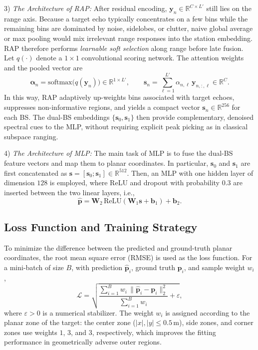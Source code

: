 \documentclass[sigconf]{acmart}
\begin{document}
3) \textit{The Architecture of RAP:}
After residual encoding, $\mathbf{y}_n\in\mathbb{R}^{C\times L'}$ still lies on the range axis. Because a target echo typically concentrates on a few bins while the remaining bins are dominated by noise, sidelobes, or clutter, naive global average or max pooling would mix irrelevant range responses into the station embedding. RAP therefore performs \emph{learnable soft selection} along range before late fusion. Let $q(\cdot)$ denote a $1\times 1$ convolutional scoring network. The attention weights and the pooled vector are
\begin{equation}
\boldsymbol{\alpha}_n=\mathrm{softmax}\bigl(q(\mathbf{y}_n)\bigr)\in\mathbb{R}^{1\times L'},
\qquad
\mathbf{s}_n=\sum_{\ell=1}^{L'}\alpha_{n,\ell}\,\mathbf{y}_{n,:,\ell}\in\mathbb{R}^{C}.
\end{equation}
In this way, RAP adaptively up-weights bins associated with target echoes, suppresses non-informative regions, and yields a compact vector $\mathbf{s}_n\in\mathbb{R}^{256}$ for each BS.
The dual-BS embeddings $\{\mathbf{s}_0,\mathbf{s}_1\}$ then provide complementary, denoised spectral cues to the MLP, without requiring explicit peak picking as in classical subspace ranging.

4) \textit{The Architecture of MLP:}
The main task of MLP is to fuse the dual-BS feature vectors and map them to planar coordinates. In particular, $\mathbf{s}_0$ and $\mathbf{s}_1$ are first concatenated as $\mathbf{s}=[\mathbf{s}_0;\mathbf{s}_1]\in\mathbb{R}^{512}$. Then, an MLP with one hidden layer of dimension $128$ is employed, where ReLU and dropout with probability $0.3$ are inserted between the two linear layers, i.e.,
\begin{equation}
\hat{\mathbf{p}}=
\mathbf{W}_2\,\mathrm{ReLU}(\mathbf{W}_1\mathbf{s}+\mathbf{b}_1)+\mathbf{b}_2.
\end{equation}

\subsection{Loss Function and Training Strategy}
To minimize the difference between the predicted and ground-truth planar coordinates, the root mean square error (RMSE) is used as the loss function. For a mini-batch of size $B$, with prediction $\hat{\mathbf{p}}_i$, ground truth $\mathbf{p}_i$, and sample weight $w_i$,
\begin{equation}
\mathcal{L}
=\sqrt{
\frac{\sum_{i=1}^{B} w_i\,\lVert\hat{\mathbf{p}}_i-\mathbf{p}_i\rVert_2^{2}}
{\sum_{i=1}^{B} w_i}
+\varepsilon
},
\end{equation}
where $\varepsilon>0$ is a numerical stabilizer. The weight $w_i$ is assigned according to the planar zone of the target: the center zone ($|x|,|y|\le 0.5\,\mathrm{m}$), side zones, and corner zones use weights $1$, $3$, and $3$, respectively, which improves the fitting performance in geometrically adverse outer regions.
\end{document}
